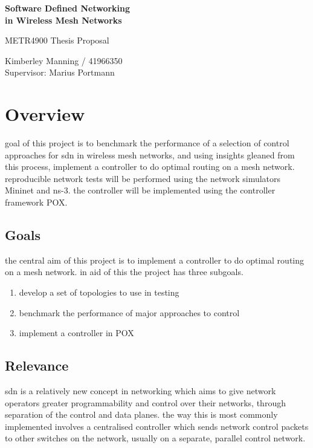 \documentclass[pdftex,12pt,a4paper]{article}
\begin{document}
\thispagestyle{empty}
\begin{center}
	\vspace*{35mm}
	{\huge\bf
		Software Defined Networking \\
		in Wireless Mesh Networks \\
	}

	\vspace{20mm}
	{\Large 
		METR4900 Thesis Proposal \\
	}

	\vspace{20mm}
	Kimberley Manning / 41966350 \\
	Supervisor: Marius Portmann
\end{center}

\newpage
\thispagestyle{empty}
\tableofcontents

\newpage
{}
\section{Overview}
goal of this project is to benchmark the performance of a selection of control approaches for sdn in wireless mesh networks, and using insights gleaned from this process, implement a controller to do optimal routing on a mesh network. reproducible network tests will be performed using the network simulators Mininet and ns-3. the controller will be implemented using the controller framework POX.

\subsection{Goals}

the central aim of this project is to implement a controller to do optimal routing on a mesh network. in aid of this the project has three subgoals.

\begin{enumerate}
	\item develop a set of topologies to use in testing
	\item benchmark the performance of major approaches to control
	\item implement a controller in POX
\end{enumerate}

\subsection{Relevance}

sdn is a relatively new concept in networking which aims to give network operators greater programmability and control over their networks, through separation of the control and data planes. the way this is most commonly implemented involves a centralised controller which sends network control packets to other switches on the network, usually on a separate, parallel control network. 
\end{document}
